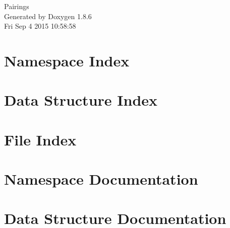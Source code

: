 \documentclass[twoside]{book}
\newcommand{\clearemptydoublepage}{%
  \newpage{\pagestyle{empty}\cleardoublepage}%
}
\begin{document}
\hypersetup{pageanchor=false}
\begin{titlepage}
\vspace*{7cm}
\begin{center}%
{\Large Pairings }\\
\vspace*{1cm}
{\large Generated by Doxygen 1.8.6}\\
\vspace*{0.5cm}
{\small Fri Sep 4 2015 10:58:58}\\
\end{center}
\end{titlepage}
\clearemptydoublepage
\tableofcontents
\clearemptydoublepage
{}
\hypersetup{pageanchor=true}

\chapter{Namespace Index}

\chapter{Data Structure Index}

\chapter{File Index}

\chapter{Namespace Documentation}




\chapter{Data Structure Documentation}
















\end{document}
